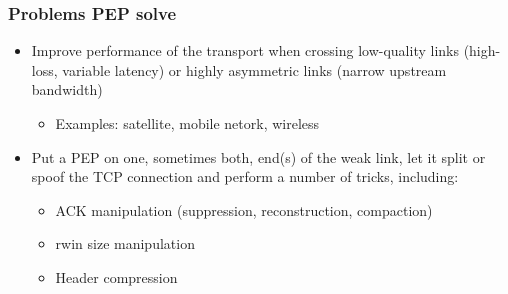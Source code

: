 \begin{frame}
  \frametitle{Problems PEP solve}
  \begin{itemize}
    \item Improve performance of the transport when crossing low-quality links (high-loss, variable latency) or highly asymmetric links (narrow upstream bandwidth)
    \begin{itemize}
      \item Examples: satellite, mobile netork, wireless
    \end{itemize}
    \item Put a PEP on one, sometimes both, end(s) of the weak link, let it split or spoof the TCP connection and perform a number of tricks, including:
    \begin{itemize}
      \item ACK manipulation (suppression, reconstruction, compaction)
      \item rwin size manipulation
      \item Header compression
    \end{itemize}
  \end{itemize}
\end{frame}
